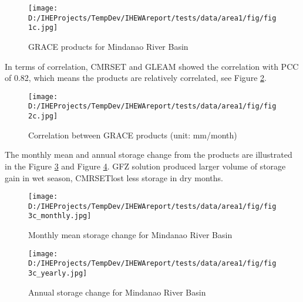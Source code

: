 \documentclass{article}%
\begin{document}
\begin{figure}[H]%
\centering%
\texttt{[image: D:/IHEProjects/TempDev/IHEWAreport/tests/data/area1/fig/fig1c.jpg]}%
\caption{GRACE products for Mindanao River Basin}%
\label{figure:fig11}%
\end{figure}

%
In terms of correlation, CMRSET and GLEAM showed the correlation with PCC of 0.82, which means the products are relatively correlated, see Figure \ref{figure:fig12}.%
\linebreak%


\begin{figure}[H]%
\centering%
\texttt{[image: D:/IHEProjects/TempDev/IHEWAreport/tests/data/area1/fig/fig2c.jpg]}%
\caption{Correlation between GRACE products (unit: mm/month)}%
\label{figure:fig12}%
\end{figure}

%
The monthly mean and annual storage change from the products are illustrated in the Figure \ref{figure:fig13} and Figure \ref{figure:fig14}. GFZ solution produced larger volume of storage gain in wet season, CMRSETlost less storage in dry months.%
\linebreak%


\begin{figure}[H]%
\centering%
\texttt{[image: D:/IHEProjects/TempDev/IHEWAreport/tests/data/area1/fig/fig3c\_monthly.jpg]}%
\caption{Monthly mean storage change for Mindanao River Basin}%
\label{figure:fig13}%
\end{figure}

%


\begin{figure}[H]%
\centering%
\texttt{[image: D:/IHEProjects/TempDev/IHEWAreport/tests/data/area1/fig/fig3c\_yearly.jpg]}%
\caption{Annual storage change  for Mindanao River Basin}%
\label{figure:fig14}%
\end{figure}

%
\end{document}
